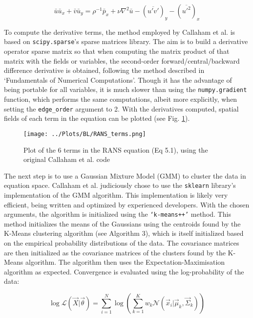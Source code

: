\documentclass[12pt]{report} %
\begin{document}
\begin{equation}
  \bar{u} \bar{u}_x + \bar{v} \bar{u}_y = \rho^{-1} \bar{p}_x + \nu \nabla^2 \bar{u}  - (\overline{u' v'})_y - (\overline{u'^2})_x
\end{equation}

To compute the derivative terms, the method employed by Callaham et al. is based on \texttt{scipy.sparse}’s sparse matrices library. The aim is to build a derivative operator sparse matrix so that when computing the matrix product of that matrix with the fields or variables, the second-order forward/central/backward difference derivative is obtained, following the method described in ‘Fundamentals of Numerical Computations’\cite{finitediff}. Though it has the advantage of being portable for all variables, it is much slower than using the \texttt{numpy.gradient} function, which performs the same computations, albeit more explicitly, when setting the \texttt{edge\_order} argument to 2. With the derivatives computed, spatial fields of each term in the equation can be plotted (see Fig. \ref{fig:RANS_terms}).

\begin{figure}
  \centering
  \texttt{[image: ../Plots/BL/RANS\_terms.png]}
  \caption{Plot of the 6 terms in the RANS equation (Eq 5.1), using the original Callaham et al. code}
  \label{fig:RANS_terms}
\end{figure}

\vspace{5mm}

The next step is to use a Gaussian Mixture Model (GMM) to cluster the data in equation space. Callaham et al. judiciously chose to use the \texttt{sklearn} library’s implementation of the GMM algorithm. This implementation is likely very efficient, being written and optimized by experienced developers. With the chosen arguments, the algorithm is initialized using the \texttt{‘k-means++’} method. This method initializes the means of the Gaussians using the centroids found by the K-Means clustering algorithm (see Algorithm 3), which is itself initialized based on the empirical probability distributions of the data\cite{arthur2007kmeans}. The covariance matrices are then initialized as the covariance matrices of the clusters found by the K-Means algorithm. The algorithm then uses the Expectation-Maximisation algorithm as expected. Convergence is evaluated using the log-probability of the data:

\begin{equation}
  \log \mathcal{L}(\vec{X} | \vec{\theta}) = \sum_{i=1}^{N} \log \left( \sum_{k=1}^{K} w_k \mathcal{N}(\vec{x}_i | \vec{\mu}_k, \vec{\Sigma}_k) \right)
\end{equation}
\end{document}
